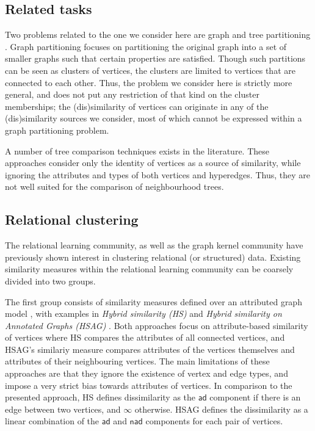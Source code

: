 \subsection{Related tasks}

Two problems related to the one we consider here are graph and tree partitioning \cite{bader2012dimacs}.
Graph partitioning focuses on partitioning the original graph into a set of smaller graphs such that certain properties are satisfied. 
Though such partitions can be seen as clusters of vertices, the clusters are limited to vertices that are connected to each other.
Thus, the problem we consider here is strictly more general, and does not put any restriction of that kind on the cluster memberships; the (dis)similarity of vertices can originate in any of the (dis)similarity sources we consider, most of which cannot be expressed within a graph partitioning problem.



A number of tree comparison techniques \cite{Bille:2005} exists in the literature.
These approaches consider only the identity of vertices as a source of similarity, while ignoring the attributes and types of both vertices and hyperedges.
Thus, they are not well suited for the comparison of neighbourhood trees.

\subsection{Relational clustering}
\label{sec:RelClust}

The relational learning community, as well as the graph kernel community have previously shown interest in clustering relational (or structured) data.
Existing similarity measures within the relational learning community can be coarsely divided into two groups.


The first group consists of similarity measures defined over an attributed graph model \cite{Pfeiffer2014}, with examples in  \textit{Hybrid similarity (HS)} \cite{Neville03clusteringrelational} and \textit{Hybrid similarity on Annotated Graphs (HSAG)} \cite{WitsenburgB11a}.
Both approaches focus on attribute-based similarity of vertices where HS compares the attributes of all connected vertices, and HSAG's similariy measure compares attributes of the vertices themselves and attributes of their neighbouring vertices.
The main limitations of these approaches are that they ignore the existence of vertex and edge types, and impose a very strict bias towards attributes of vertices. 
In comparison to the presented approach, HS defines dissimilarity as the $\mathsf{ad}$ component if there is an edge between two vertices, and $\infty$ otherwise. 
HSAG defines the dissimilarity as a linear combination of the $\mathsf{ad}$ and $\mathsf{nad}$ components for each pair of vertices.  



